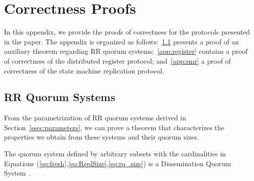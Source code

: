 \chapter{Correctness Proofs}\label{chapter:appendixA}

In this appendix, we provide the proofs of correctness for the
protocols presented in the paper. The appendix is organized as
follows:~\ref{app:quorum} presents a proof of an auxiliary
theorem regarding \ac{RR} quorum systems;~\ref{app:register}
contains a proof of correctness of the distributed register
protocol; and~\ref{app:smr} a proof of correctness of the state
machine replication protocol.

\section{\ac{RR} Quorum Systems}\label{app:quorum}

From the parametrization of \ac{RR} quorum systems derived
in Section~\ref{ssec:parameters}, we can prove a theorem that
characterizes the properties we obtain from these systems and
their quorum sizes.

\begin{theorem}\label{thrmQ}
  The quorum system defined by arbitrary subsets with the
    cardinalities in Equations
    (\ref{eq:fresh},\ref{eq:ReplSize},\ref{eq:rq_size}) is a
    Dissemination Quorum System~\cite{Malkhi:Reiter:BQS:98}.
\end{theorem}


